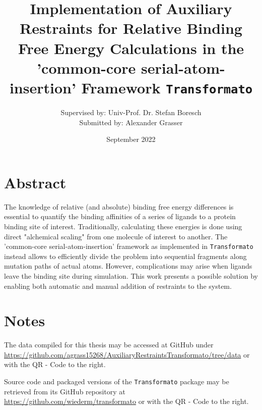 \documentclass[oneside]{scrreprt}
\title{Implementation of Auxiliary Restraints for Relative Binding Free Energy Calculations in the 'common-core serial-atom-insertion' Framework \texttt{Transformato}}
\author{Supervised by: Univ-Prof. Dr. Stefan Boresch\\Submitted by: \hspace{26mm}Alexander Grasser}
\date{September 2022}
\begin{document}
\begin{titlepage}

\maketitle{}
\end{titlepage}
\section*{Abstract}
    The knowledge of relative (and absolute) binding free energy differences is essential to quantify the binding affinities of a series of ligands to a protein binding site of interest. Traditionally, calculating these energies is done using direct "alchemical scaling" from one molecule of interest to another. The 'common-core serial-atom-insertion' framework as implemented in \texttt{Transformato} instead allows to efficiently divide the problem into sequential fragments along mutation paths of actual atoms. However, complications may arise when ligands leave the binding site during simulation. This work presents a possible solution by enabling both automatic and manual addition of restraints to the system.
\vspace{\fill}
\section*{Notes}
\noindent\begin{minipage}{0.7\textwidth}
The data compiled for this thesis may be accessed at GitHub under \url{https://github.com/agrass15268/AuxiliaryRestraintsTransformato/tree/data} or with the QR - Code to the right.
\end{minipage}
\hspace{0.1\textwidth}
\begin{minipage}{0.2\textwidth}

\end{minipage}
 
\vspace{1cm}

\noindent\begin{minipage}{0.7\textwidth}
Source code and packaged versions of the \texttt{Transformato} package may be retrieved from its GitHub repository at  \url{https://github.com/wiederm/transformato} or with the QR - Code to the right.
\end{minipage}
\hspace{0.1\textwidth}
\begin{minipage}{0.2\textwidth}

\end{minipage}
\newpage
\end{document}
